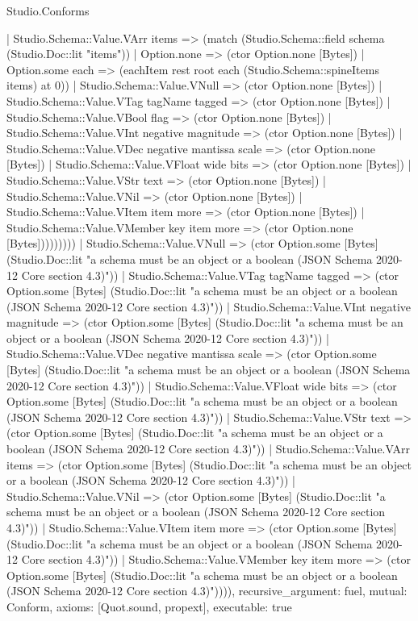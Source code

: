 \begin{lexlean}{Studio.Conforms}
\begin{semanticmodule}
{          | Studio.Schema::Value.VArr items => (match (Studio.Schema::field schema (Studio.Doc::lit "items"))
            | Option.none => (ctor Option.none [Bytes])
            | Option.some each => (eachItem rest root each (Studio.Schema::spineItems items) at 0))
          | Studio.Schema::Value.VNull => (ctor Option.none [Bytes])
          | Studio.Schema::Value.VTag tagName tagged => (ctor Option.none [Bytes])
          | Studio.Schema::Value.VBool flag => (ctor Option.none [Bytes])
          | Studio.Schema::Value.VInt negative magnitude => (ctor Option.none [Bytes])
          | Studio.Schema::Value.VDec negative mantissa scale => (ctor Option.none [Bytes])
          | Studio.Schema::Value.VFloat wide bits => (ctor Option.none [Bytes])
          | Studio.Schema::Value.VStr text => (ctor Option.none [Bytes])
          | Studio.Schema::Value.VNil => (ctor Option.none [Bytes])
          | Studio.Schema::Value.VItem item more => (ctor Option.none [Bytes])
          | Studio.Schema::Value.VMember key item more => (ctor Option.none [Bytes]))))))))
      | Studio.Schema::Value.VNull => (ctor Option.some [Bytes] (Studio.Doc::lit "a schema must be an object or a boolean (JSON Schema 2020-12 Core section 4.3)"))
      | Studio.Schema::Value.VTag tagName tagged => (ctor Option.some [Bytes] (Studio.Doc::lit "a schema must be an object or a boolean (JSON Schema 2020-12 Core section 4.3)"))
      | Studio.Schema::Value.VInt negative magnitude => (ctor Option.some [Bytes] (Studio.Doc::lit "a schema must be an object or a boolean (JSON Schema 2020-12 Core section 4.3)"))
      | Studio.Schema::Value.VDec negative mantissa scale => (ctor Option.some [Bytes] (Studio.Doc::lit "a schema must be an object or a boolean (JSON Schema 2020-12 Core section 4.3)"))
      | Studio.Schema::Value.VFloat wide bits => (ctor Option.some [Bytes] (Studio.Doc::lit "a schema must be an object or a boolean (JSON Schema 2020-12 Core section 4.3)"))
      | Studio.Schema::Value.VStr text => (ctor Option.some [Bytes] (Studio.Doc::lit "a schema must be an object or a boolean (JSON Schema 2020-12 Core section 4.3)"))
      | Studio.Schema::Value.VArr items => (ctor Option.some [Bytes] (Studio.Doc::lit "a schema must be an object or a boolean (JSON Schema 2020-12 Core section 4.3)"))
      | Studio.Schema::Value.VNil => (ctor Option.some [Bytes] (Studio.Doc::lit "a schema must be an object or a boolean (JSON Schema 2020-12 Core section 4.3)"))
      | Studio.Schema::Value.VItem item more => (ctor Option.some [Bytes] (Studio.Doc::lit "a schema must be an object or a boolean (JSON Schema 2020-12 Core section 4.3)"))
      | Studio.Schema::Value.VMember key item more => (ctor Option.some [Bytes] (Studio.Doc::lit "a schema must be an object or a boolean (JSON Schema 2020-12 Core section 4.3)")))),
  recursive_argument: fuel,
  mutual: Conform,
  axioms: [Quot.sound, propext],
  executable: true
}


\end{semanticmodule}
\end{lexlean}
